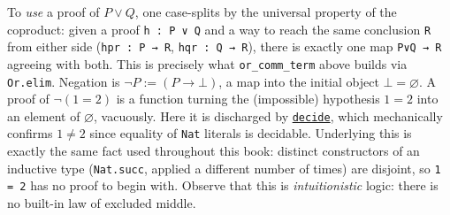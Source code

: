 To \emph{use} a proof of \(P \vee Q\), one case-splits by the universal property of the coproduct: given a proof \texttt{h : P ∨ Q} and a way to reach the same conclusion \texttt{R} from either side (\texttt{hpr : P → R}, \texttt{hqr : Q → R}), there is exactly one map \texttt{P∨Q → R} agreeing with both. This is precisely what \texttt{or\_\allowbreak{}comm\_\allowbreak{}term} above builds via \texttt{Or.elim}. Negation is \(\neg P := (P \to \bot)\), a map into the initial object \(\bot = \varnothing\). A proof of \(\neg(1=2)\) is a function turning the (impossible) hypothesis \(1 = 2\) into an element of \(\varnothing\), vacuously. Here it is discharged by \href{https://lean-lang.org/doc/reference/latest/Tactic-Proofs/Tactic-Reference/}{\texttt{decide}}, which mechanically confirms \(1 \neq 2\) since equality of \texttt{Nat} literals is decidable. Underlying this is exactly the same fact used throughout this book: distinct constructors of an inductive type (\texttt{Nat.succ}, applied a different number of times) are disjoint, so \texttt{1 = 2} has no proof to begin with. Observe that this is \emph{intuitionistic} logic: there is no built-in law of excluded middle.
